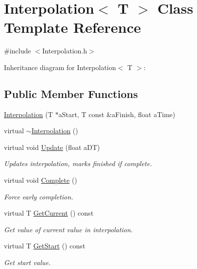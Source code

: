 \hypertarget{classInterpolation}{}\section{Interpolation$<$ T $>$ Class Template Reference}
\label{classInterpolation}


{\ttfamily \#include $<$Interpolation.\+h$>$}



Inheritance diagram for Interpolation$<$ T $>$\+:
\subsection*{Public Member Functions}
\begin{DoxyCompactItemize}
\item 
\hyperlink{classInterpolation_acf905e4bddd16531c032a85650e7c7a6}{Interpolation} (T $\ast$a\+Start, T const \&a\+Finish, float a\+Time)
\item 
virtual \hyperlink{classInterpolation_a01a98f3fc0f9f27032bace4e59ea0e15}{$\sim$\+Interpolation} ()
\item 
virtual void \hyperlink{classInterpolation_a5fbf76da88d318a02b47b60d04d6df4c}{Update} (float a\+DT)
\begin{DoxyCompactList}\small\item\em Updates interpolation, marks finished if complete. \end{DoxyCompactList}\item 
virtual void \hyperlink{classInterpolation_a526d8fa5bb510091234749af430c9e25}{Complete} ()
\begin{DoxyCompactList}\small\item\em Force early completion. \end{DoxyCompactList}\item 
virtual T \hyperlink{classInterpolation_ac0443b444c67e3b2b310b7520e189b75}{Get\+Current} () const 
\begin{DoxyCompactList}\small\item\em Get value of current value in interpolation. \end{DoxyCompactList}\item 
virtual T \hyperlink{classInterpolation_a50bece38eff6a5a3a7032802b103a702}{Get\+Start} () const 
\begin{DoxyCompactList}\small\item\em Get start value. \end{DoxyCompactList}\item 

\end{DoxyCompactItemize}
